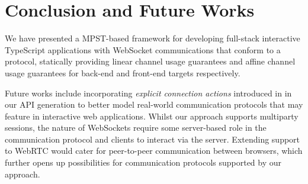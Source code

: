 \section{Conclusion and Future Works}
We have presented a MPST-based framework for developing full-stack interactive
TypeScript applications with WebSocket communications that conform to a
protocol, statically providing linear channel usage guarantees and affine
channel usage guarantees for back-end and front-end targets respectively.

Future works include incorporating \textit{explicit connection actions}
introduced in \cite{ExplicitConnections} in our API generation to better model
real-world communication protocols that may feature in interactive web
applications.
Whilst our approach supports multiparty sessions, the nature of
WebSockets require some server-based role in the communication protocol and
clients to interact via the server.
Extending support to WebRTC  would
cater for peer-to-peer communication between browsers, which further opens up
possibilities for communication protocols supported by our approach.


